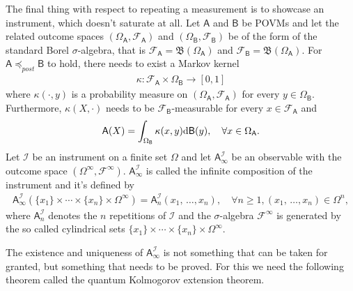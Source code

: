 \documentclass[a4paper,12pt]{wihuri}
\theoremstyle{definition}
\numberwithin{definition}{section}
\numberwithin{example}{section}
\numberwithin{theorem}{section}
\numberwithin{proposition}{section}
\numberwithin{lemma}{section}
\newcommand{\I}{\mathcal{I}}%
\newcommand{\salg}{\mathcal{F}}%
\newcommand{\borel}{\mathfrak{B}}
\newcommand{\A}{\mathsf{A}}%
\newcommand{\B}{\mathsf{B}}%
\newcommand{\pp}{\preceq_{post}}
\begin{document}
The final thing with respect to repeating a measurement is to showcase an instrument, which doesn't saturate at all. Let $\A$ and $\B$ be POVMs and let the related outcome spaces $(\Omega_\A, \salg_\A)$ and $(\Omega_\B, \salg_\B)$ be of the form of the standard Borel $\sigma$-algebra, that is $\salg_\A = \borel(\Omega_\A)$ and $\salg_\B = \borel(\Omega_\A)$. For $\A \pp \B$ to hold, there needs to exist a Markov kernel
\begin{align*}
\kappa: \salg_\A \times \Omega_\B \rightarrow [0,1]
\end{align*}
where $\kappa(\cdot, y)$ is a probability measure on $(\Omega_\A, \salg_\A)$ for every $y \in \Omega_\B$. Furthermore, $\kappa(X, \cdot)$ needs to be $\salg_\B$-measurable for every $x \in \salg_\A$ and
\begin{align*}
\A(X) = \int_{\Omega_\B}\kappa(x,y)\text{d}\B(y), \quad \forall x \in \Omega_\A\text.
\end{align*}
Let $\I$ be an instrument on a finite set $\Omega$ and let $\A_{\infty}^\I$ be an observable with the outcome space $(\Omega^{\infty}, \salg^{\infty})$. $\A_{\infty}^\I$ is called the infinite composition of the instrument and it's defined by
\begin{align*}
\A_{\infty}^\I(\{x_1\} \times \cdots \times \{x_n\} \times \Omega^{\infty}) = \A_n^\I(x_1,\,\ldots,x_n), \quad \forall n \geq 1, (x_1,\,\ldots,x_n) \in \Omega^n,
\end{align*}
where $\A_n^\I$ denotes the $n$ repetitions of $\I$ and the $\sigma$-algebra $\salg^{\infty}$ is generated by the so called cylindrical sets $\{x_1\} \times \cdots \times \{x_n\} \times \Omega^{\infty}$. 

The existence and uniqueness of $\A_{\infty}^\I$ is not something that can be taken for granted, but something that needs to be proved. For this we need the following theorem called the quantum Kolmogorov extension theorem\cite{kuramochi_constrution}\cite{Tumulka2008_kolmogorov}.

\end{document}
